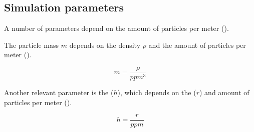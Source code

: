 \subsection{Simulation parameters}

A number of parameters depend on the amount of particles per meter
().

The particle mass $m$ depends on the density $\rho$ and the amount of particles
per meter ().

\[
m = \frac{\rho}{ppm^3}
\]

Another relevant parameter is the  ($h$), which
depends on the  ($r$) and amount of particles per
meter ().

\[
h = \frac{r}{ppm}
\]
